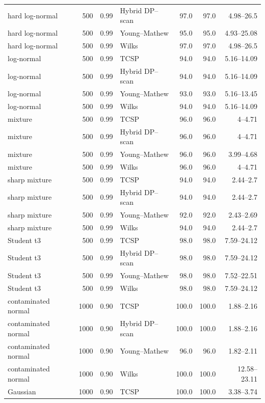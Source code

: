 \begin{longtable}{@{}p{}rrp{}rrr@{}}
hard log-normal & 500 & 0.99 & Hybrid DP--scan & 97.0 & 97.0 & 4.98--26.5 \\
hard log-normal & 500 & 0.99 & Young--Mathew & 95.0 & 95.0 & 4.93--25.08 \\
hard log-normal & 500 & 0.99 & Wilks & 97.0 & 97.0 & 4.98--26.5 \\
log-normal & 500 & 0.99 & TCSP & 94.0 & 94.0 & 5.16--14.09 \\
log-normal & 500 & 0.99 & Hybrid DP--scan & 94.0 & 94.0 & 5.16--14.09 \\
log-normal & 500 & 0.99 & Young--Mathew & 93.0 & 93.0 & 5.16--13.45 \\
log-normal & 500 & 0.99 & Wilks & 94.0 & 94.0 & 5.16--14.09 \\
mixture & 500 & 0.99 & TCSP & 96.0 & 96.0 & 4--4.71 \\
mixture & 500 & 0.99 & Hybrid DP--scan & 96.0 & 96.0 & 4--4.71 \\
mixture & 500 & 0.99 & Young--Mathew & 96.0 & 96.0 & 3.99--4.68 \\
mixture & 500 & 0.99 & Wilks & 96.0 & 96.0 & 4--4.71 \\
sharp mixture & 500 & 0.99 & TCSP & 94.0 & 94.0 & 2.44--2.7 \\
sharp mixture & 500 & 0.99 & Hybrid DP--scan & 94.0 & 94.0 & 2.44--2.7 \\
sharp mixture & 500 & 0.99 & Young--Mathew & 92.0 & 92.0 & 2.43--2.69 \\
sharp mixture & 500 & 0.99 & Wilks & 94.0 & 94.0 & 2.44--2.7 \\
Student t3 & 500 & 0.99 & TCSP & 98.0 & 98.0 & 7.59--24.12 \\
Student t3 & 500 & 0.99 & Hybrid DP--scan & 98.0 & 98.0 & 7.59--24.12 \\
Student t3 & 500 & 0.99 & Young--Mathew & 98.0 & 98.0 & 7.52--22.51 \\
Student t3 & 500 & 0.99 & Wilks & 98.0 & 98.0 & 7.59--24.12 \\
contaminated normal & 1000 & 0.90 & TCSP & 100.0 & 100.0 & 1.88--2.16 \\
contaminated normal & 1000 & 0.90 & Hybrid DP--scan & 100.0 & 100.0 & 1.88--2.16 \\
contaminated normal & 1000 & 0.90 & Young--Mathew & 96.0 & 96.0 & 1.82--2.11 \\
contaminated normal & 1000 & 0.90 & Wilks & 100.0 & 100.0 & 12.58--23.11 \\
Gaussian & 1000 & 0.90 & TCSP & 100.0 & 100.0 & 3.38--3.74 \\

\end{longtable}
